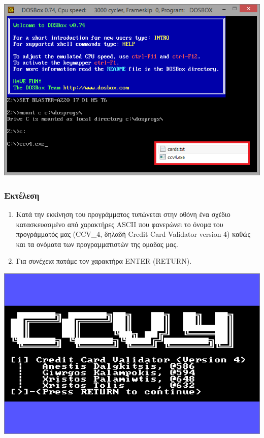 \documentclass[10pt,a4paper]{article}
\begin{document}
\begin{center}
\includegraphics[scale=0.7]{cdosboxloadext.PNG}
\end{center}

\pagebreak

\subsubsection*{Εκτέλεση}
\begin{enumerate}
\item Κατά την εκκίνηση του προγράμματος τυπώνεται στην οθόνη ένα σχέδιο κατασκευασμένο από χαρακτήρες \latintext ASCII \greektext που φανερώνει το όνομα του προγράμματός μας \latintext (CCV\_4, \greektext δηλαδή \latintext Credit Card Validator version 4) \greektext καθώς και τα ονόματα των προγραμματιστών της ομαδας μας.
\item Για συνέχεια πατάμε τον χαρακτήρα \latintext ENTER (RETURN)\greektext.
\end{enumerate}

\includegraphics[scale=0.7]{csplash.PNG}
\end{document}
